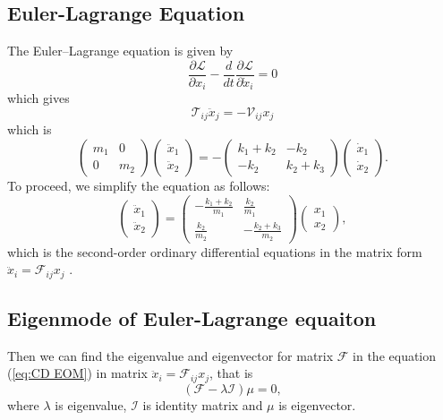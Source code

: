 \documentclass[a4paper, reprint, showkeys, nofootinbib,twoside]{revtex4-1}
\begin{document}
	 \subsection{Euler-Lagrange Equation}
	 The Euler–Lagrange equation is given by
	 \begin{equation}
	 \frac {\partial \mathcal{L}}{\partial x_{i}}-\frac {d}{dt}\frac {\partial \mathcal{L}}{\partial \dot {x}_{i}}=0
	 \end{equation}
	 which gives
	 \begin{equation}
	 \mathcal{T}_{ij}\ddot{x}_j = -\mathcal{V}_{ij}x_j
	 \end{equation}
	 which is 
	 \begin{equation}
	 \begin{pmatrix}m_1&0\\0&m_2\end{pmatrix}
	 \begin{pmatrix}\ddot{x}_1\\\ddot{x}_2\end{pmatrix}
	 =
	 -\begin{pmatrix}k_1+k_2&-k_2\\-k_2&k_2+k_3\end{pmatrix}
	 \begin{pmatrix}\dot{x}_1\\\dot{x}_2\end{pmatrix}.
	 \end{equation}
	 To proceed, we simplify the equation as follows:
	 \begin{equation}\label{eq:CD EOM}
	 \begin{pmatrix}\ddot{x}_1\\\ddot{x}_2\end{pmatrix}
	 =
	 \begin{pmatrix}
	 \displaystyle - \frac{k_1+k_2}{m_1}	&\displaystyle  \frac{k_2}{m_1}\\[2ex]
	 \displaystyle  \frac{k_2}{m_2} 		&\displaystyle  -\frac{k_2+k_3}{m_2}
	 \end{pmatrix}
	 \begin{pmatrix}x_1\\x_2\end{pmatrix},
	 \end{equation}
	 which is the second-order ordinary differential equations in the matrix form $\ddot{x}_i = \mathcal{F}_{ij}x_j$ .
	 \subsection{Eigenmode of Euler-Lagrange equaiton}
	 Then we can find the eigenvalue and eigenvector for matrix $\mathcal{F}$ in the equation (\ref{eq:CD EOM}) in matrix $\ddot{x}_i = \mathcal{F}_{ij}x_j$, that is 
	 \begin{equation}
	 \left(\mathcal{F}-\lambda\mathcal{I}\right)\mu = 0,
	 \end{equation}
	 where $\lambda$ is eigenvalue, $\mathcal{I}$ is identity matrix and $\mu$ is eigenvector.
\end{document}
